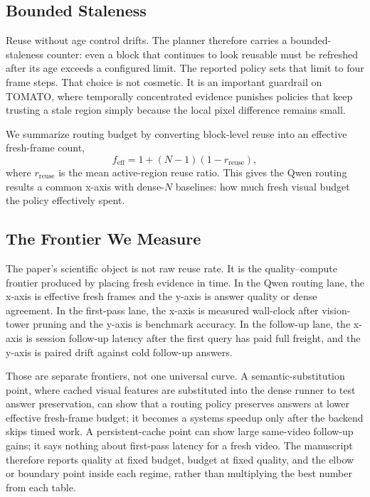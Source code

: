 \subsection{Bounded Staleness}

Reuse without age control drifts. The planner therefore carries a
bounded-staleness counter: even a block that continues to look reusable must be
refreshed after its age exceeds a configured limit. The reported policy sets
that limit to four frame steps. That choice is not cosmetic.
It is an important guardrail on TOMATO, where temporally concentrated evidence
punishes policies that keep trusting a stale region simply because the local
pixel difference remains small.

We summarize routing budget by converting block-level reuse into an effective
fresh-frame count,
\[
f_{\mathrm{eff}} = 1 + (N - 1)(1 - r_{\mathrm{reuse}}),
\]
where $r_{\mathrm{reuse}}$ is the mean active-region reuse ratio. This gives
the Qwen routing results a common x-axis with dense-$N$ baselines: how much
fresh visual budget the policy effectively spent.

\subsection{The Frontier We Measure}

The paper's scientific object is not raw reuse rate. It is the
quality--compute frontier produced by placing fresh evidence in time. In the
Qwen routing lane, the x-axis is effective fresh frames and the y-axis is
answer quality or dense agreement. In the first-pass lane, the x-axis is
measured wall-clock after vision-tower pruning and the y-axis is benchmark
accuracy. In the follow-up lane, the x-axis is session follow-up latency after
the first query has paid full freight, and the y-axis is paired drift against
cold follow-up answers.

Those are separate frontiers, not one universal curve. A semantic-substitution
point, where cached visual features are substituted into the dense runner to
test answer preservation, can show that a routing policy preserves answers at
lower effective fresh-frame budget; it becomes a systems speedup only after
the backend skips timed work. A persistent-cache point can show large
same-video follow-up gains; it says nothing about first-pass latency for a
fresh video. The manuscript
therefore reports quality at fixed budget, budget at fixed quality, and the
elbow or boundary point inside each regime, rather than multiplying the best
number from each table.

